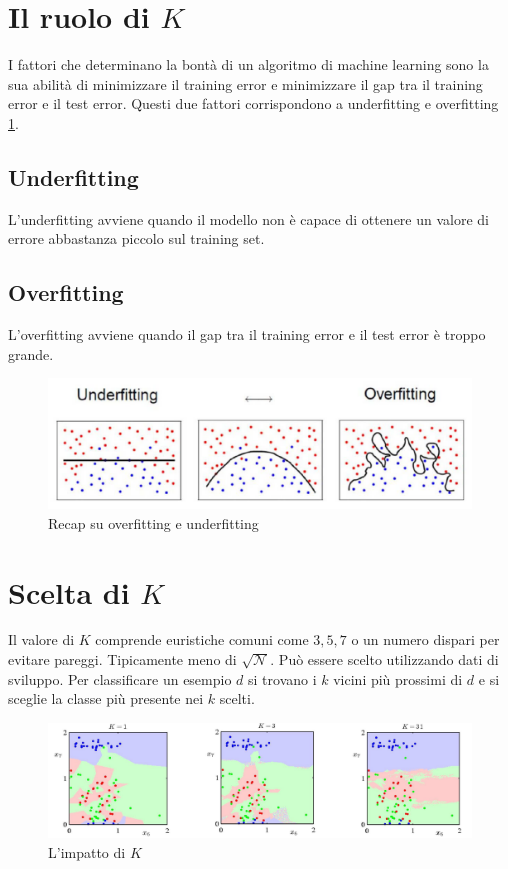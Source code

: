 \section{Il ruolo di $K$}
I fattori che determinano la bont\`a di un algoritmo di machine learning sono la sua abilit\`a di minimizzare il training error e minimizzare il gap tra il training error e il test error.
Questi due fattori corrispondono a underfitting e overfitting \ref{fig:chapter03-00}.

\subsection{Underfitting}
L'underfitting avviene quando il modello non \`e capace di ottenere un valore di errore abbastanza piccolo sul training set.

\subsection{Overfitting}
L'overfitting avviene quando il gap tra il training error e il test error \`e troppo grande.

\begin{figure}
	\centering
	\includegraphics[width=0.6\linewidth]{imgs/chapter3/img1}
	\caption{Recap su overfitting e underfitting}
	\label{fig:chapter03-00}
\end{figure}

\section{Scelta di $K$}
Il valore di $K$ comprende euristiche comuni come $3, 5, 7$ o un numero dispari per evitare pareggi. Tipicamente meno di $\sqrt{\mathcal{N}}$.
Pu\`o essere scelto utilizzando dati di sviluppo.
Per classificare un esempio $d$ si trovano i $k$ vicini pi\`u prossimi di $d$ e si sceglie la classe pi\`u presente nei $k$ scelti.

\begin{figure}
	\centering
	\includegraphics[width=0.6\linewidth]{imgs/chapter3/img0}
	\caption{L'impatto di $K$}
	\label{fig:chapter03-01}
\end{figure}

